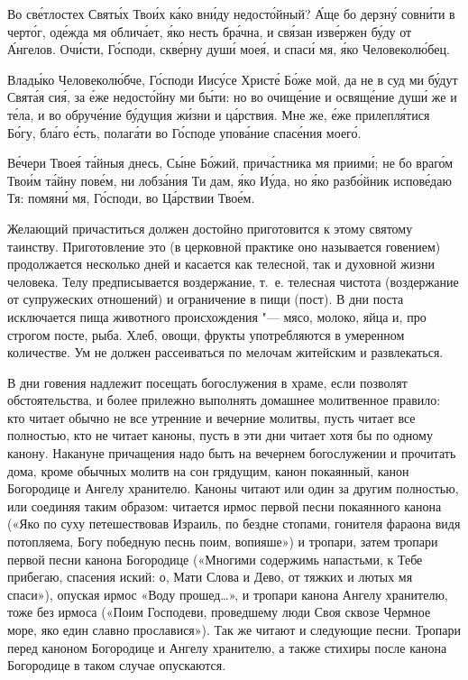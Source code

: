 \begin{mymulticols}
Во св\'{е}тлостех Свят\'{ы}х Тво\'{и}х к\'{а}ко вн\'{и}ду недост\'{о}йный? \'{А}ще бо дерзн\'{у} совн\'{и}ти в черт\'{о}г, од\'{е}жда мя облич\'{а}ет, \'{я}ко несть бр\'{а}чна, и св\'{я}зан изв\'{е}ржен б\'{у}ду от \'{А}нгелов. Оч\'{и}сти, Г\'{о}споди, скв\'{е}рну душ\'{и} мое\'{я}, и спас\'{и} мя, \'{я}ко Человекол\'{ю}бец.


Влад\'{ы}ко Человекол\'{ю}бче, Г\'{о}споди Иис\'{у}се Христ\'{е} Б\'{о}же мой, да не в суд ми б\'{у}дут Свят\'{а}я си\'{я}, за \'{е}же недост\'{о}йну ми б\'{ы}ти: но во очищ\'{е}ние и освящ\'{е}ние душ\'{и} же и т\'{е}ла, и во обруч\'{е}ние б\'{у}дущия ж\'{и}зни и ц\'{а}рствия. Мне же, \'{е}же прилепл\'{я}тися Б\'{о}гу, бл\'{а}го \'{е}сть, полаг\'{а}ти во Г\'{о}споде упов\'{а}ние спас\'{е}ния моег\'{о}.


В\'{е}чери Твое\'{я} т\'{а}йныя днесь, С\'{ы}не Б\'{о}жий, прич\'{а}стника мя приим\'{и}; не бо враг\'{о}м Тво\'{и}м т\'{а}йну пов\'{е}м, ни лобз\'{а}ния Ти дам, \'{я}ко И\'{у}да, но \'{я}ко разб\'{о}йник испов\'{е}даю Тя: помян\'{и} мя, Г\'{о}споди, во Ц\'{а}рствии Тво\'{е}м.

\end{mymulticols}

\myparsep[0.25]

\medskip Желающий причаститься должен достойно приготовится к этому святому таинству. Приготовление это (в церковной практике оно называется говением) продолжается несколько дней и касается как телесной, так и духовной жизни человека. Телу предписывается воздержание, т.~е. телесная чистота (воздержание от супружеских отношений) и ограничение в пищи (пост). В дни поста исключается пища животного происхождения "--- мясо, молоко, яйца и, про строгом посте, рыба. Хлеб, овощи, фрукты употребляются в умеренном количестве. Ум не должен рассеиваться по мелочам житейским и развлекаться.

В дни говения надлежит посещать богослужения в храме, если позволят обстоятельства, и более прилежно выполнять домашнее молитвенное правило: кто читает обычно не все утренние и вечерние молитвы, пусть читает все полностью, кто не читает каноны, пусть в эти дни читает хотя бы по одному канону. Накануне причащения надо быть на вечернем богослужении и прочитать дома, кроме обычных молитв на сон грядущим, канон покаянный, канон Богородице и Ангелу хранителю. Каноны читают или один за другим полностью, или соединяя таким образом: читается ирмос первой песни покаянного канона («Яко по суху петешествовав Израиль, по бездне стопами, гонителя фараона видя потопляема, Богу победную песнь поим, вопияше») и тропари, затем тропари первой песни канона Богородице («Многими содержимь напастьми, к Тебе прибегаю, спасения иский: о, Мати Слова и Дево, от тяжких и лютых мя спаси»), опуская ирмос «Воду прошед…», и тропари канона Ангелу хранителю, тоже без ирмоса («Поим Господеви, проведшему люди Своя сквозе Чермное море, яко един славно прославися»). Так же читают и следующие песни. Тропари перед каноном Богородице и Ангелу хранителю, а также стихиры после канона Богородице в таком случае опускаются.

